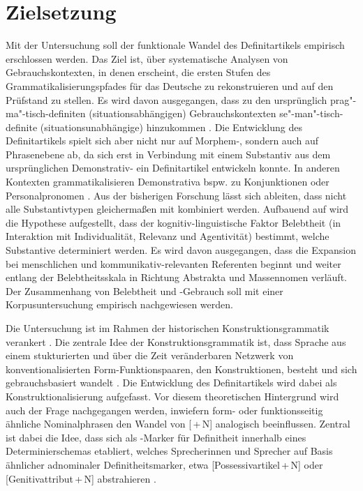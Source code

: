 \section{Zielsetzung} 
Mit der Untersuchung soll der funktionale Wandel des Definitartikels empirisch erschlossen werden. Das Ziel ist, über systematische Analysen von Gebrauchskontexten, in denen  erscheint, die ersten Stufen des Grammatikalisierungspfades \parencite{Lehmann2015} für das Deutsche zu rekonstruieren und auf den Prüfstand zu stellen. Es wird davon ausgegangen, dass zu den ursprünglich prag"-ma"-tisch-definiten (situationsabhängigen) Gebrauchskontexten se"-man"-tisch-definite (situationsunabhängige) hinzukommen \parencite{Lobner1985,Himmelmann1997}. 
Die Entwicklung des Definitartikels spielt sich aber nicht nur auf  Morphem-, sondern auch auf Phrasenebene ab, da sich erst in Verbindung mit einem Substantiv aus dem ursprünglichen Demonstrativ- ein Definitartikel entwickeln konnte. In anderen Kontexten grammatikalisieren Demonstrativa bspw. zu Konjunktionen oder Personalpronomen \parencite{Diessel1999}. Aus der bisherigen Forschung \parencite[u.a.][]{Oubouzar1989,Oubouzar1992}
lässt sich ableiten, dass nicht alle Substantivtypen gleichermaßen mit  kombiniert werden. Aufbauend auf \textcite{Szczepaniak2011a,Enger2011} wird die Hypothese aufgestellt, dass der kognitiv-linguistische Faktor Belebtheit (in Interaktion mit Individualität, Relevanz und Agentivität) bestimmt, welche Substantive determiniert werden. Es wird davon ausgegangen, dass die Expansion bei menschlichen und kommunikativ-relevanten Referenten beginnt und weiter entlang der Belebtheitsskala in Richtung Abstrakta und Massennomen verläuft. Der Zusammenhang von Belebtheit und -Gebrauch soll mit einer Korpusuntersuchung empirisch nachgewiesen werden.  

Die Untersuchung ist im Rahmen der historischen Konstruktionsgrammatik verankert \parencite[s. u.a.][]{Traugott2003,Bergs2008,Traugott2013}. Die zentrale Idee der Konstruktionsgrammatik ist, dass Sprache aus einem stukturierten und über die Zeit veränderbaren Netzwerk von konventionalisierten Form-Funktionspaaren, den Konstruktionen, besteht und sich gebrauchsbasiert wandelt \parencite{Bybee2010,Bybee2013}. Die Entwicklung des Definitartikels wird dabei als Konstruktionalisierung aufgefasst. Vor diesem theoretischen Hintergrund wird auch der Frage nachgegangen werden, inwiefern form- oder funktionsseitig ähnliche Nominalphrasen den Wandel von [\,+\,N] analogisch beeinflussen. Zentral ist dabei die Idee, dass sich  als -Marker für Definitheit innerhalb eines Determinierschemas etabliert, welches Sprecherinnen und Sprecher auf Basis ähnlicher adnominaler Definitheitsmarker, etwa  [Possessivartikel\,+\,N]  oder [Genitivattribut\,+\,N] abstrahieren \parencite[vgl. fürs Englische][]{Sommerer2015}.


